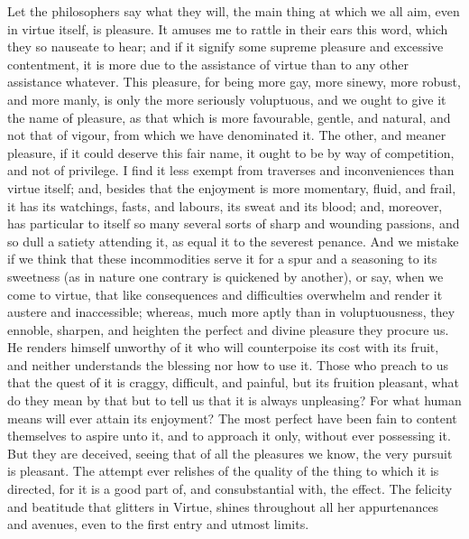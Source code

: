 Let the philosophers say what they will, the main thing at which we
all aim, even in virtue itself, is pleasure. It amuses me to rattle in
their ears this word, which they so nauseate to hear; and if it
signify some supreme pleasure and excessive contentment, it is more
due to the assistance of virtue than to any other assistance whatever.
This pleasure, for being more gay, more sinewy, more robust, and more
manly, is only the more seriously voluptuous, and we ought to give it
the name of pleasure, as that which is more favourable, gentle, and
natural, and not that of vigour, from which we have denominated it.
The other, and meaner pleasure, if it could deserve this fair name, it
ought to be by way of competition, and not of privilege. I find it
less exempt from traverses and inconveniences than virtue itself; and,
besides that the enjoyment is more momentary, fluid, and frail, it has
its watchings, fasts, and labours, its sweat and its blood; and,
moreover, has particular to itself so many several sorts of sharp and
wounding passions, and so dull a satiety attending it, as equal it to
the severest penance. And we mistake if we think that these
incommodities serve  it for a spur and a seasoning to its
sweetness (as in nature one contrary is quickened by another), or say,
when we come to virtue, that like consequences and difficulties
overwhelm and render it austere and inaccessible; whereas, much more
aptly than in voluptuousness, they ennoble, sharpen, and heighten the
perfect and divine pleasure they procure us. He renders himself
unworthy of it who will counterpoise its cost with its fruit, and
neither understands the blessing nor how to use it. Those who preach
to us that the quest of it is craggy, difficult, and painful, but its
fruition pleasant, what do they mean by that but to tell us that it is
always unpleasing? For what human means will ever attain its
enjoyment? The most perfect have been fain to content themselves to
aspire unto it, and to approach it only, without ever possessing it.
But they are deceived, seeing that of all the pleasures we know, the
very pursuit is pleasant. The attempt ever relishes of the quality of
the thing to which it is directed, for it is a good part of, and
consubstantial with, the effect. The felicity and beatitude that
glitters in Virtue, shines throughout all her appurtenances and
avenues, even to the first entry and utmost limits.

